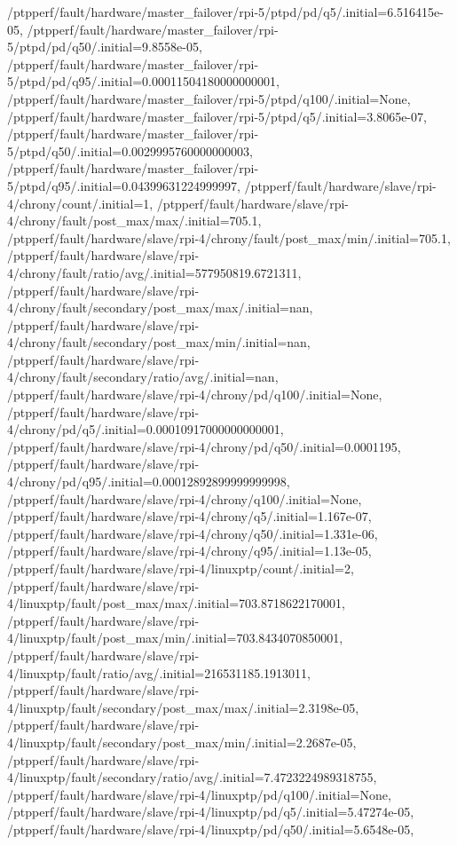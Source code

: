{    /ptpperf/fault/hardware/master_failover/rpi-5/ptpd/pd/q5/.initial=6.516415e-05,
    /ptpperf/fault/hardware/master_failover/rpi-5/ptpd/pd/q50/.initial=9.8558e-05,
    /ptpperf/fault/hardware/master_failover/rpi-5/ptpd/pd/q95/.initial=0.00011504180000000001,
    /ptpperf/fault/hardware/master_failover/rpi-5/ptpd/q100/.initial=None,
    /ptpperf/fault/hardware/master_failover/rpi-5/ptpd/q5/.initial=3.8065e-07,
    /ptpperf/fault/hardware/master_failover/rpi-5/ptpd/q50/.initial=0.0029995760000000003,
    /ptpperf/fault/hardware/master_failover/rpi-5/ptpd/q95/.initial=0.04399631224999997,
    /ptpperf/fault/hardware/slave/rpi-4/chrony/count/.initial=1,
    /ptpperf/fault/hardware/slave/rpi-4/chrony/fault/post_max/max/.initial=705.1,
    /ptpperf/fault/hardware/slave/rpi-4/chrony/fault/post_max/min/.initial=705.1,
    /ptpperf/fault/hardware/slave/rpi-4/chrony/fault/ratio/avg/.initial=577950819.6721311,
    /ptpperf/fault/hardware/slave/rpi-4/chrony/fault/secondary/post_max/max/.initial=nan,
    /ptpperf/fault/hardware/slave/rpi-4/chrony/fault/secondary/post_max/min/.initial=nan,
    /ptpperf/fault/hardware/slave/rpi-4/chrony/fault/secondary/ratio/avg/.initial=nan,
    /ptpperf/fault/hardware/slave/rpi-4/chrony/pd/q100/.initial=None,
    /ptpperf/fault/hardware/slave/rpi-4/chrony/pd/q5/.initial=0.00010917000000000001,
    /ptpperf/fault/hardware/slave/rpi-4/chrony/pd/q50/.initial=0.0001195,
    /ptpperf/fault/hardware/slave/rpi-4/chrony/pd/q95/.initial=0.00012892899999999998,
    /ptpperf/fault/hardware/slave/rpi-4/chrony/q100/.initial=None,
    /ptpperf/fault/hardware/slave/rpi-4/chrony/q5/.initial=1.167e-07,
    /ptpperf/fault/hardware/slave/rpi-4/chrony/q50/.initial=1.331e-06,
    /ptpperf/fault/hardware/slave/rpi-4/chrony/q95/.initial=1.13e-05,
    /ptpperf/fault/hardware/slave/rpi-4/linuxptp/count/.initial=2,
    /ptpperf/fault/hardware/slave/rpi-4/linuxptp/fault/post_max/max/.initial=703.8718622170001,
    /ptpperf/fault/hardware/slave/rpi-4/linuxptp/fault/post_max/min/.initial=703.8434070850001,
    /ptpperf/fault/hardware/slave/rpi-4/linuxptp/fault/ratio/avg/.initial=216531185.1913011,
    /ptpperf/fault/hardware/slave/rpi-4/linuxptp/fault/secondary/post_max/max/.initial=2.3198e-05,
    /ptpperf/fault/hardware/slave/rpi-4/linuxptp/fault/secondary/post_max/min/.initial=2.2687e-05,
    /ptpperf/fault/hardware/slave/rpi-4/linuxptp/fault/secondary/ratio/avg/.initial=7.4723224989318755,
    /ptpperf/fault/hardware/slave/rpi-4/linuxptp/pd/q100/.initial=None,
    /ptpperf/fault/hardware/slave/rpi-4/linuxptp/pd/q5/.initial=5.47274e-05,
    /ptpperf/fault/hardware/slave/rpi-4/linuxptp/pd/q50/.initial=5.6548e-05,
}
